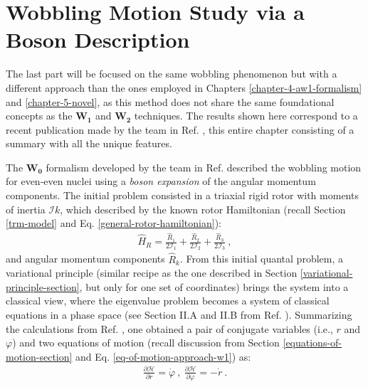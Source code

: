 \chapter{Wobbling Motion Study via a Boson Description}
\label{extra-chapter-new-boson}

The last part will be focused on the same wobbling phenomenon but with a different approach than the ones employed in Chapters \ref{chapter-4-aw1-formalism} and \ref{chapter-5-novel}, as this method does not share the same foundational concepts as the $\mathbf{W_1}$ and $\mathbf{W_2}$ techniques. The results shown here correspond to a recent publication made by the team in Ref. \cite{raduta2020new}, this entire chapter consisting of a summary with all the unique features.

The $\mathbf{W_0}$ formalism developed by the team in Ref. \cite{raduta2017semiclassical} described the wobbling motion for even-even nuclei using a \emph{boson expansion} of the angular momentum components. The initial problem consisted in a triaxial rigid rotor with moments of inertia $\mathcal{I}k$, which described by the known rotor Hamiltonian (recall Section \ref{trm-model} and Eq. \ref{general-rotor-hamiltonian}):
\begin{align}
    \hat{H}_R=\frac{\hat{R}_1}{2\mathcal{I}_1}+\frac{\hat{R}_2}{2\mathcal{I}_2}+\frac{\hat{R}_3}{2\mathcal{I}_3}\ ,
\end{align}
and angular momentum components $\hat{R}_k$. From this initial quantal problem, a variational principle (similar recipe as the one described in Section \ref{variational-principle-section}, but only for one set of coordinates) brings the system into a classical view, where the eigenvalue problem becomes a system of classical equations in a phase space (see Section II.A and II.B from Ref. \cite{raduta2017semiclassical}). Summarizing the calculations from Ref. \cite{raduta2017semiclassical}, one obtained a pair of conjugate variables (i.e., $r$ and $\varphi$) and two equations of motion (recall discussion from Section \ref{equations-of-motion-section} and Eq. \ref{eq-of-motion-approach-w1}) as:
\begin{align}
    \frac{\partial\mathcal{H}}{\partial r}=\dot{\varphi}\ ,\ \frac{\partial\mathcal{H}}{\partial\varphi}=-\dot{r}\ .
\end{align}

